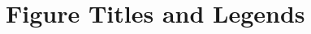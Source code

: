 \documentclass[12pt]{article}
\begin{document}













\newpage
\section*{Figure Titles and Legends}

\end{document}
